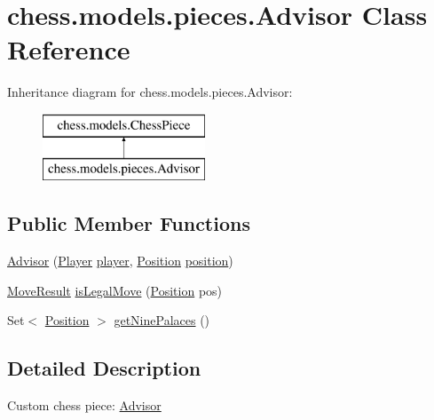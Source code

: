 \hypertarget{classchess_1_1models_1_1pieces_1_1_advisor}{}\section{chess.\+models.\+pieces.\+Advisor Class Reference}
\label{classchess_1_1models_1_1pieces_1_1_advisor}
Inheritance diagram for chess.\+models.\+pieces.\+Advisor\+:\begin{figure}[H]
\begin{center}
\leavevmode
\includegraphics[height=2.000000cm]{classchess_1_1models_1_1pieces_1_1_advisor}
\end{center}
\end{figure}
\subsection*{Public Member Functions}
\begin{DoxyCompactItemize}
\item 
\mbox{\hyperlink{classchess_1_1models_1_1pieces_1_1_advisor_acad748f8b4188895b58996d0cef0a5d0}{Advisor}} (\mbox{\hyperlink{enumchess_1_1models_1_1enums_1_1_player}{Player}} \mbox{\hyperlink{classchess_1_1models_1_1_chess_piece_a3bcc8a24667318b5aab8c146adcc3eb7}{player}}, \mbox{\hyperlink{classchess_1_1models_1_1_position}{Position}} \mbox{\hyperlink{classchess_1_1models_1_1_chess_piece_a0e4f8616b75e548f269d3971846396f3}{position}})
\item 
\mbox{\hyperlink{enumchess_1_1models_1_1enums_1_1_move_result}{Move\+Result}} \mbox{\hyperlink{classchess_1_1models_1_1pieces_1_1_advisor_afd4015213fb9b97240f4235a9776f972}{is\+Legal\+Move}} (\mbox{\hyperlink{classchess_1_1models_1_1_position}{Position}} pos)
\item 
Set$<$ \mbox{\hyperlink{classchess_1_1models_1_1_position}{Position}} $>$ \mbox{\hyperlink{classchess_1_1models_1_1pieces_1_1_advisor_aec70114aea45fb0b4c102a81df30f60c}{get\+Nine\+Palaces}} ()
\end{DoxyCompactItemize}


\subsection{Detailed Description}
Custom chess piece\+: \mbox{\hyperlink{classchess_1_1models_1_1pieces_1_1_advisor}{Advisor}} 

